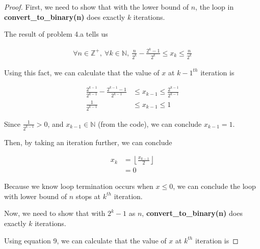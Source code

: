 \documentclass[12pt]{article}
\begin{document}
\begin{enumerate}[a.]
\begin{proof}
        \bigskip

        First, we need to show that with the lower bound of $n$, the loop in
        \textbf{convert\_to\_binary(n)} does exactly $k$ iterations.

        \bigskip

        The result of problem 4.a tells us

        \begin{align}
            \forall n \in \mathbb{Z}^{+},\:\forall k \in \mathbb{N},\:\frac{n}{2^k} - \frac{2^k - 1}{2^k} \leq x_k \leq \frac{n}{2^k}
        \end{align}


        Using this fact, we can calculate that the value of $x$ at $k-1^{th}$ iteration is

        \bigskip

        \begin{align}
            \frac{2^{k-1}}{2^{k-1}} - \frac{2^{k-1} - 1}{2^{k-1}} &\leq x_{k-1} \leq \frac{2^{k-1}}{2^{k-1}}\\
            \frac{1}{2^{k-1}} &\leq x_{k-1} \leq 1
        \end{align}

        \bigskip

        Since $\frac{1}{2^{k-1}} > 0$, and $x_{k-1} \in \mathbb{N}$ (from the code),
        we can conclude $x_{k-1} = 1$.

        \bigskip

        Then, by taking an iteration further, we can conclude

        \begin{align}
            x_k &= \left\lfloor \frac{x_{k-1}}{2} \right\rfloor\\
            &= 0
        \end{align}

        \bigskip

        Because we know loop termination occurs when $x \leq 0$, we can conclude
        the loop with lower bound of $n$ stops at $k^{th}$ iteration.

        \bigskip

        Now, we need to show that with $2^k - 1$ as $n$, \textbf{convert\_to\_binary(n)}
        does exactly $k$ iterations.

        \bigskip

        Using equation 9, we can calculate that the value of
        $x$ at $k^{th}$ iteration is

        \bigskip


\end{proof}
\end{enumerate}
\end{document}
